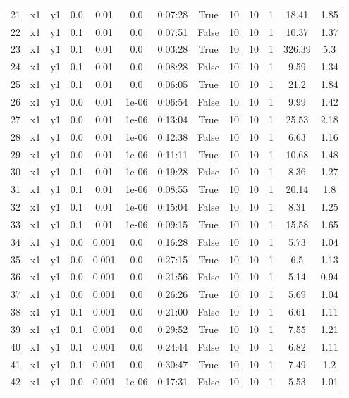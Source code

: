 \begin{longtable}{c | c | c | c | c | c | c | c | c | c | c | c | c}
21 & x1 & y1 & 0.0 & 0.01 & 0.0 & 0:07:28 & True & 10 & 10 & 1 & 18.41 & 1.85 \\
22 & x1 & y1 & 0.1 & 0.01 & 0.0 & 0:07:51 & False & 10 & 10 & 1 & 10.37 & 1.37 \\
23 & x1 & y1 & 0.1 & 0.01 & 0.0 & 0:03:28 & True & 10 & 10 & 1 & 326.39 & 5.3 \\
24 & x1 & y1 & 0.1 & 0.01 & 0.0 & 0:08:28 & False & 10 & 10 & 1 & 9.59 & 1.34 \\
25 & x1 & y1 & 0.1 & 0.01 & 0.0 & 0:06:05 & True & 10 & 10 & 1 & 21.2 & 1.84 \\
26 & x1 & y1 & 0.0 & 0.01 & 1e-06 & 0:06:54 & False & 10 & 10 & 1 & 9.99 & 1.42 \\
27 & x1 & y1 & 0.0 & 0.01 & 1e-06 & 0:13:04 & True & 10 & 10 & 1 & 25.53 & 2.18 \\
28 & x1 & y1 & 0.0 & 0.01 & 1e-06 & 0:12:38 & False & 10 & 10 & 1 & 6.63 & 1.16 \\
29 & x1 & y1 & 0.0 & 0.01 & 1e-06 & 0:11:11 & True & 10 & 10 & 1 & 10.68 & 1.48 \\
30 & x1 & y1 & 0.1 & 0.01 & 1e-06 & 0:19:28 & False & 10 & 10 & 1 & 8.36 & 1.27 \\
31 & x1 & y1 & 0.1 & 0.01 & 1e-06 & 0:08:55 & True & 10 & 10 & 1 & 20.14 & 1.8 \\
32 & x1 & y1 & 0.1 & 0.01 & 1e-06 & 0:15:04 & False & 10 & 10 & 1 & 8.31 & 1.25 \\
33 & x1 & y1 & 0.1 & 0.01 & 1e-06 & 0:09:15 & True & 10 & 10 & 1 & 15.58 & 1.65 \\
34 & x1 & y1 & 0.0 & 0.001 & 0.0 & 0:16:28 & False & 10 & 10 & 1 & 5.73 & 1.04 \\
35 & x1 & y1 & 0.0 & 0.001 & 0.0 & 0:27:15 & True & 10 & 10 & 1 & 6.5 & 1.13 \\
36 & x1 & y1 & 0.0 & 0.001 & 0.0 & 0:21:56 & False & 10 & 10 & 1 & 5.14 & 0.94 \\
37 & x1 & y1 & 0.0 & 0.001 & 0.0 & 0:26:26 & True & 10 & 10 & 1 & 5.69 & 1.04 \\
38 & x1 & y1 & 0.1 & 0.001 & 0.0 & 0:21:00 & False & 10 & 10 & 1 & 6.61 & 1.11 \\
39 & x1 & y1 & 0.1 & 0.001 & 0.0 & 0:29:52 & True & 10 & 10 & 1 & 7.55 & 1.21 \\
40 & x1 & y1 & 0.1 & 0.001 & 0.0 & 0:24:44 & False & 10 & 10 & 1 & 6.82 & 1.11 \\
41 & x1 & y1 & 0.1 & 0.001 & 0.0 & 0:30:47 & True & 10 & 10 & 1 & 7.49 & 1.2 \\
42 & x1 & y1 & 0.0 & 0.001 & 1e-06 & 0:17:31 & False & 10 & 10 & 1 & 5.53 & 1.01 \\

\end{longtable}
